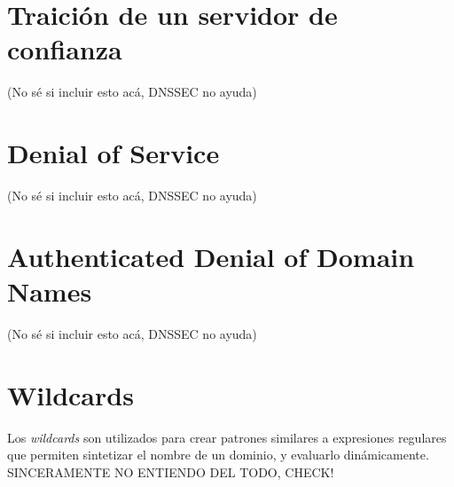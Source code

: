 \section{Traici\'on de un servidor de confianza}
(No s\'e si incluir esto ac\'a, DNSSEC no ayuda)
\section{Denial of Service}
(No s\'e si incluir esto ac\'a, DNSSEC no ayuda)
\section{Authenticated Denial of Domain Names}
(No s\'e si incluir esto ac\'a, DNSSEC no ayuda)
\section{Wildcards}
Los \textit{wildcards} son utilizados para crear patrones similares a expresiones regulares que permiten sintetizar el nombre de un dominio, y evaluarlo din\'amicamente\cite{rfc1034}. SINCERAMENTE NO ENTIENDO DEL TODO, CHECK!